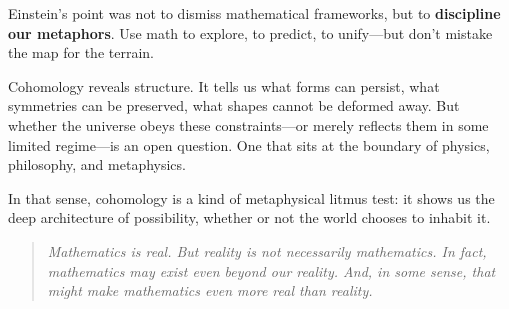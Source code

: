 \medskip


Einstein’s point was not to dismiss mathematical frameworks, but to \textbf{discipline our metaphors}.  
Use math to explore, to predict, to unify—but don’t mistake the map for the terrain.

Cohomology reveals structure. It tells us what forms can persist, what symmetries can be preserved, what shapes cannot be deformed away.  
But whether the universe obeys these constraints—or merely reflects them in some limited regime—is an open question. One that sits at the boundary of physics, philosophy, and metaphysics.


In that sense, cohomology is a kind of metaphysical litmus test: it shows us the deep architecture of possibility, whether or not the world chooses to inhabit it.

\begin{quote}
\textit{Mathematics is real. But reality is not necessarily mathematics.  In fact, mathematics may exist even beyond our reality. And, in some sense, that might make mathematics even more real than reality.}
\end{quote}



